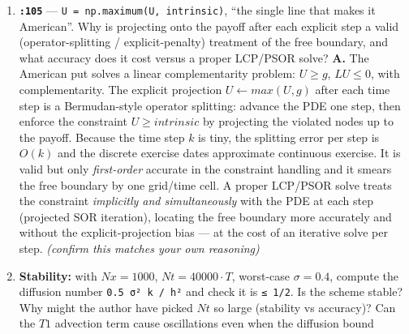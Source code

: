 \documentclass[
  11pt,
]{article}
\begin{document}
\begin{enumerate}
  \(K·exp(-r·time2mat)\). What Dirichlet boundary condition does
  \(p[0]\) enforce at the deep-ITM edge, and why is no correction added
  at the high-\(S\) boundary? \textbf{A.} The initial condition (line
  46, \(τ=0\)) is the put payoff \(max(K−e^m,0)\). At the lower edge
  \(m→−∞\) (deep ITM, \(S→0\)) the put value tends to
  \texttt{K\ e\^{}\{−rτ\}\ −\ S\ ≈\ K\ e\^{}\{−rτ\}} (discounted
  strike). The central-difference stencil at the first interior node
  references the ghost node just below the grid, whose Dirichlet value
  is \(K e^{−rτ}\); \(p[0]\) (line 51) injects exactly that boundary
  value, scaled by the matching stencil coefficient
  \texttt{(½kσ²/h²\ −\ k(r−½σ²)/(2h))} and \(K·exp(−r·time2mat)\). At
  the high-\(S\) edge (\(m→+∞\)) the put value → 0, so the Dirichlet
  value there is zero and no correction term is needed --- \(p\) stays
  zero on that side.
\item
  \textbf{\texttt{:105}} --- \texttt{U\ =\ np.maximum(U,\ intrinsic)},
  ``the single line that makes it American''. Why is projecting onto the
  payoff after each explicit step a valid (operator-splitting /
  explicit-penalty) treatment of the free boundary, and what accuracy
  does it cost versus a proper LCP/PSOR solve? \textbf{A.} The American
  put solves a linear complementarity problem: \(U ≥ g\), \(LU ≤ 0\),
  with complementarity. The explicit projection \(U ← max(U, g)\) after
  each time step is a Bermudan-style operator splitting: advance the PDE
  one step, then enforce the constraint \(U ≥ intrinsic\) by projecting
  the violated nodes up to the payoff. Because the time step \(k\) is
  tiny, the splitting error per step is \(O(k)\) and the discrete
  exercise dates approximate continuous exercise. It is valid but only
  \emph{first-order} accurate in the constraint handling and it smears
  the free boundary by one grid/time cell. A proper LCP/PSOR solve
  treats the constraint \emph{implicitly and simultaneously} with the
  PDE at each step (projected SOR iteration), locating the free boundary
  more accurately and without the explicit-projection bias --- at the
  cost of an iterative solve per step. \emph{(confirm this matches your
  own reasoning)}
\item
  \textbf{Stability:} with \(Nx=1000\), \(Nt=40000·T\), worst-case
  \(σ=0.4\), compute the diffusion number \texttt{0.5\ σ²\ k\ /\ h²} and
  check it is \texttt{≤\ 1/2}. Is the scheme stable? Why might the
  author have picked \(Nt\) so large (stability vs accuracy)? Can the
  \(T1\) advection term cause oscillations even when the diffusion bound

\end{enumerate}
\end{document}
